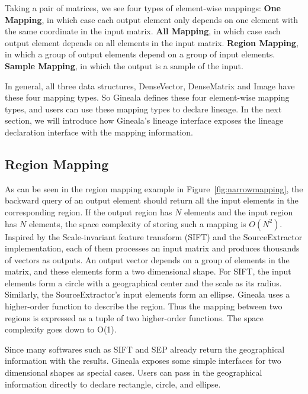 \documentclass{sig-alternate}
\begin{document}
Taking a pair of matrices, we see four types of element-wise mappings: 
{\bf One Mapping}, in which case each output element only depends on one element with the same coordinate in the input matrix.
{\bf All Mapping}, in which case each output element depends on all elements in the input matrix.
{\bf Region Mapping}, in which a group of output elements depend on a group of input elements.
{\bf Sample Mapping}, in which the output is a sample of the input.

In general, all three data structures, DenseVector, DenseMatrix and Image have these four mapping types. 
So Gineala defines these four element-wise mapping types, and users can use these mapping types to declare lineage. 
In the next section, we will introduce how Gineala's lineage interface exposes the lineage declaration interface with the mapping information.


\subsection{Region Mapping}
\label{sec:Design-RegionMapping}
As can be seen in the region mapping example in Figure~\ref{fig:narrowmapping}, the backward query of an output element should return all the input elements in the corresponding region. If the output region has $N$ elements and the input region has $N$ elements, the space complexity of storing such a mapping is $O(N^2)$. 
Inspired by the Scale-invariant feature transform (SIFT) and the SourceExtractor implementation, each of them processes an input matrix and produces thousands of vectors as outputs. An output vector depends on a group of elements in the matrix, and these elements form a two dimensional shape. 
For SIFT, the input elements form a circle with a geographical center and the scale as its radius.
Similarly, the SourceExtractor's input elements  form an ellipse. 
Gineala uses a higher-order function to describe the region. 
Thus the mapping between two regions is expressed as a tuple of two higher-order functions.
The space complexity goes down to O(1).

Since many softwares such as SIFT and SEP already return the geographical information with the results.
Gineala exposes some simple interfaces for two dimensional shapes as special cases.
Users can pass in the geographical information directly to declare rectangle, circle, and ellipse.
\end{document}
